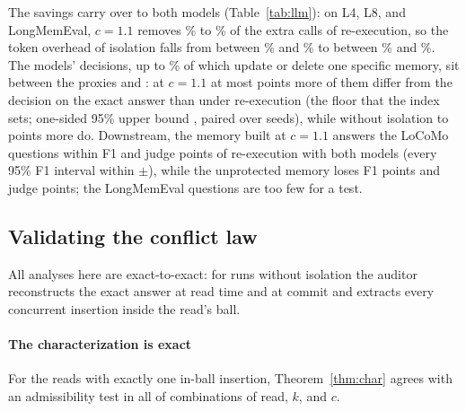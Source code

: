 \documentclass[sigconf, nonacm, review]{acmart}
\begin{document}
The savings carry over to both models (Table~\ref{tab:llm}): on L4,
L8, and LongMemEval, $c=1.1$ removes \% to
\% of the extra calls of re-execution, so the token
overhead of isolation falls from between
\% and \% to between
\% and \%. The models'
decisions, up to \% of which update or delete
one specific memory, sit between the proxies  and : at $c=1.1$
at most  points more of them differ from the
decision on the exact answer than under re-execution (the floor that
the index sets; one-sided 95\% upper bound , paired over seeds), while without isolation 
to  points more do. Downstream, the memory
built at $c=1.1$ answers the LoCoMo questions within
 F1 and  judge points of re-execution with both models
(every 95\% F1 interval within
$\pm$), while the unprotected memory loses
 F1 points and
 judge points; the
 LongMemEval questions are too few for a test.

\subsection{Validating the conflict law}
\label{sec:eval-law}

All analyses here are exact-to-exact: for runs without isolation the
auditor reconstructs the exact answer at read time and at commit and
extracts every concurrent insertion inside the read's ball.

\paragraph{The characterization is exact}
For the  reads with exactly one in-ball
insertion, Theorem~\ref{thm:char} agrees with an
admissibility test in all  of
 combinations of read, $k$, and $c$.
\end{document}
